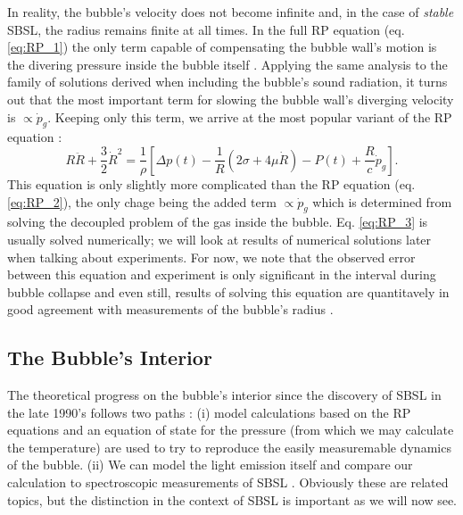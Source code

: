 \documentclass[rmp,aps,nofootinbib,superscriptaddress,floatfix]{revtex4-2}
\begin{document}
In reality, the bubble's velocity does not become infinite and, in the case of \emph{stable} SBSL, the radius remains finite at all times. In the full RP equation (eq. \ref{eq:RP_1}) the only term capable of compensating the bubble wall's motion is the divering pressure inside the bubble itself \cite{brenner2002single}. Applying the same analysis to the family of solutions derived when including the bubble's sound radiation, it turns out that the most important term for slowing the bubble wall's diverging velocity is $\propto\dot{p}_g$. Keeping only this term, we arrive at the most popular variant of the RP equation \cite{lofstedt1995sonoluminescing,barber1997defining}:
\begin{equation}
    R\ddot{R}+\frac{3}{2}\dot{R}^2 = \frac{1}{\rho} \left[ \Delta p(t)-\frac{1}{R}\left( 2\sigma+4\mu \dot{R} \right)-P(t) +\frac{R}{c} \dot{p}_g \right].
    \label{eq:RP_3}
\end{equation}
This equation is only slightly more complicated than the RP equation (eq. \ref{eq:RP_2}), the only chage being the added term $\propto \dot{p}_g$ which is determined from solving the decoupled problem of the gas inside the bubble. Eq. \ref{eq:RP_3} is usually solved numerically; we will look at results of numerical solutions later when talking about experiments. For now, we note that the observed error between this equation and experiment is only significant in the interval during bubble collapse and even still, results of solving this equation are quantitavely in good agreement with measurements of the bubble's radius \cite{brenner2002single}. 


\subsection{The Bubble's Interior}

The theoretical progress on the bubble's interior since the discovery of SBSL in the late 1990's \cite{gaitan1992sonoluminescence} follows two paths \cite{brenner2002single,suslick2008inside,yasui2018acoustic}: (i) model calculations based on the RP equations and an equation of state for the pressure (from which we may calculate the temperature) are used to try to reproduce the easily measuremable dynamics of the bubble. (ii) We can model the light emission itself and compare our calculation to spectroscopic measurements of SBSL \cite{}. Obviously these are related topics, but the distinction in the context of SBSL is important as we will now see.
\end{document}
